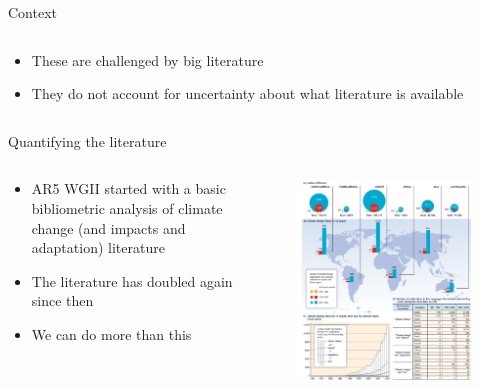 \documentclass[9pt]{beamer}
\begin{document}
\begin{frame}{Context}
\begin{columns}
\begin{column}{0.312\linewidth}
		\begin{itemize}
			\small
			\item<2->These are challenged by big literature \cite{Callaghan2020} 
			\item<3->They do not account for uncertainty about what literature is available
		\end{itemize}
	\end{column}
\end{columns}

\end{frame}

\begin{frame}{Quantifying the literature}

\begin{columns}
	
	\begin{column}{0.382\linewidth}
	\begin{itemize}
		\item AR5 WGII started with a basic bibliometric analysis of climate change (and impacts and adaptation) literature
		\item The literature has doubled again since then
		\item We can do more than this
	\end{itemize}
\end{column}

	\begin{column}{0.618\linewidth}
		\begin{figure}
			\includegraphics[width=0.7\textheight]{ar5_fig_1_1}
		\end{figure}
	\end{column}


\end{columns}
\end{frame}
\end{document}
